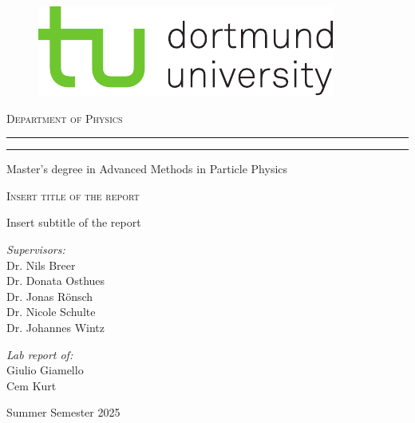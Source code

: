 \begin{titlepage}
	
	\begin{figure}[ht]
		\vspace{-0.5cm} %
		\begin{center}
			\includegraphics[scale=1.50]{tud_logos/logo_tud_english.pdf}
		\end{center}
	\end{figure}

    \vspace{15mm} %
	
	\begin{center}
		{{\large{\textsc{Department of Physics}}}}
		\rule[0.1cm]{\linewidth}{0.3mm} %
		\rule[0.5cm]{\linewidth}{0.3mm} %
		Master’s degree in Advanced Methods in Particle Physics
	\end{center}
	
	\vspace{25mm} %
	\begin{center}
		\begin{Large}
			\textsc{Insert title of the report}
		\end{Large}
        
        \vspace{5mm} %
        Insert subtitle of the report
	\end{center}
	
	\vspace{35mm} %
	\noindent
	\begin{minipage}[t]{0.47\textwidth}
		{\large{\textit{Supervisors:}
        \\ Dr. Nils Breer
        \\ Dr. Donata Osthues
        \\ Dr. Jonas Rönsch
        \\ Dr. Nicole Schulte
        \\ Dr. Johannes Wintz}}
	\end{minipage}
	\hfill
	\begin{minipage}[t]{0.47\textwidth}\raggedleft
		{\large{\textit{Lab report of:}
        \\ Giulio Giamello
        \\Cem Kurt}}
	\end{minipage}
	\vfill
	\vspace{15mm}
	\begin{center}
		{\large{Summer Semester 2025}}
	\end{center}
	\vspace{-2cm}
	
\end{titlepage}
